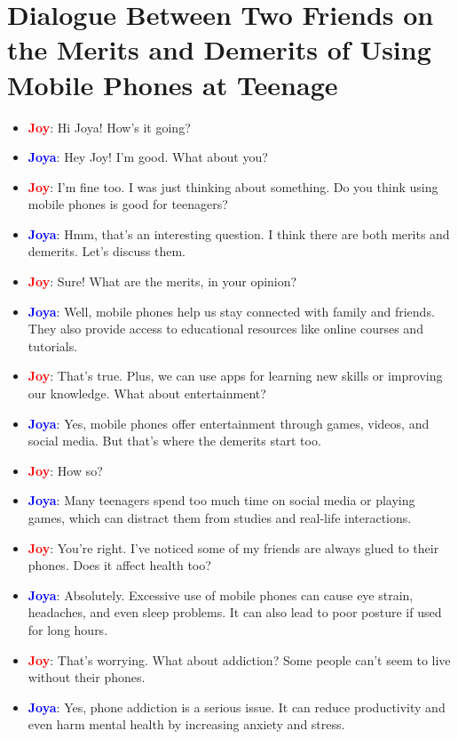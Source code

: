 \documentclass{article}
\begin{document}
\section*{Dialogue Between Two Friends on the Merits and Demerits of Using Mobile Phones at Teenage}
\begin{itemize}
    \item \textbf{\textcolor{red}{Joy}}: Hi Joya! How’s it going?
    \item \textbf{\textcolor{blue}{Joya}}: Hey Joy! I’m good. What about you?
    \item \textbf{\textcolor{red}{Joy}}: I’m fine too. I was just thinking about something. Do you think using mobile phones is good for teenagers?
    \item \textbf{\textcolor{blue}{Joya}}: Hmm, that’s an interesting question. I think there are both merits and demerits. Let’s discuss them.
    \item \textbf{\textcolor{red}{Joy}}: Sure! What are the merits, in your opinion?
    \item \textbf{\textcolor{blue}{Joya}}: Well, mobile phones help us stay connected with family and friends. They also provide access to educational resources like online courses and tutorials.
    \item \textbf{\textcolor{red}{Joy}}: That’s true. Plus, we can use apps for learning new skills or improving our knowledge. What about entertainment?
    \item \textbf{\textcolor{blue}{Joya}}: Yes, mobile phones offer entertainment through games, videos, and social media. But that’s where the demerits start too.
    \item \textbf{\textcolor{red}{Joy}}: How so?
    \item \textbf{\textcolor{blue}{Joya}}: Many teenagers spend too much time on social media or playing games, which can distract them from studies and real-life interactions.
    \item \textbf{\textcolor{red}{Joy}}: You’re right. I’ve noticed some of my friends are always glued to their phones. Does it affect health too?
    \item \textbf{\textcolor{blue}{Joya}}: Absolutely. Excessive use of mobile phones can cause eye strain, headaches, and even sleep problems. It can also lead to poor posture if used for long hours.
    \item \textbf{\textcolor{red}{Joy}}: That’s worrying. What about addiction? Some people can’t seem to live without their phones.
    \item \textbf{\textcolor{blue}{Joya}}: Yes, phone addiction is a serious issue. It can reduce productivity and even harm mental health by increasing anxiety and stress.

\end{itemize}
\end{document}

